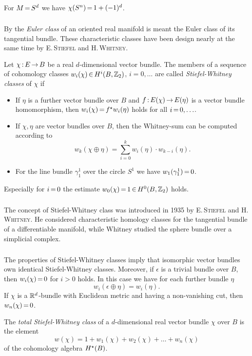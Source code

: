 \documentclass[11pt,twoside]{article}
\begin{document}
\begin{example}
For ${M} {\,=\,} S^d$ we have $\chi(S^n) {\,=\,} 1 + (-1)^d$.
\end{example}

\subparagraph{}
By the \textit{Euler class} of an oriented real manifold is meant
the Euler class of its tangential bundle.
These characteristic classes have been design nearly at the same time
by \textsc{E.\,Stiefel} and \textsc{H.\,Whitney}.

\begin{definition}
Let $\chi{\,:\,}E {\,\to\,} B$ be a real $d$-dimensional vector bundle.
The members of a sequence of cohomology classes
$w_i(\chi) {\,\in\,} H^i(B,{\mathbb{Z}}_2)$, $i=0,\ldots$
are called \textit{Stiefel-Whitney classes} of $\chi$ if

\begin{itemize}[leftmargin=15pt]
\item[1.]
If $\eta$ is a further vector bundle over $B$
and $f{\,:\,}E(\chi) {\,\to\,} E(\eta)$ is a vector bundle homomorphism,
then $w_i(\chi) {\,=\,} f^{\star} w_i(\eta)$ holds for all $i {\,=\,} 0,\ldots$.
\item[2.]
If $\chi,\eta$ are vector bundles over $B$,
then the Whitney-sum can be computed according to
\[
w_k(\chi \oplus \eta) = \sum_{i=0}^k w_i(\eta) \cdot w_{k-i}(\eta).
\]
\item[3.]
For the line bundle $\gamma_1^1$ over the circle $S^1$
we have $w_1(\gamma_1^1) {\,=\,} 0$.
\end{itemize}
\end{definition}

Especially for $i {\,=\,} 0$ the estimate $w_0(\chi) {\,=\,} 1 {\,\in\,} H^0(B,{\mathbb{Z}}_2)$ holds.

\subparagraph{}
The concept of Stiefel-Whitney class was introduced in 1935
by \textsc{E.\,Stiefel} and \textsc{H.\,Whitney}.
He considered characteristic homology classes for the
tangential bundle of a differentiable manifold,
while Whitney studied the sphere bundle over a simplicial complex.

\subparagraph{}
The properties of Stiefel-Whitney classes imply
that isomorphic vector bundles own identical Stiefel-Whitney classes.
Moreover,
if $\epsilon$ is a trivial bundle over $B$,
then $w_i(\chi) {\,=\,} 0$ for $i > 0$ holds.
In this case we have for each further bundle $\eta$
\[
w_i(\epsilon \oplus \eta) = w_i(\eta).
\]
If $\chi$ is a ${\mathbb{R}}^d$-bundle with Euclidean metric and having a non-vanishing cut,
then $w_n(\chi) {\,=\,} 0$.

\begin{definition}
The \textit{total Stiefel-Whitney class}
of a $d$-dimensional real vector bundle $\chi$ over $B$ is the element
\[
w(\chi) = 1 + w_1(\chi) + w_2(\chi) + \ldots + w_n(\chi)
\]
of the cohomology algebra $H^{\star}(B)$.
\end{definition}
\end{document}
